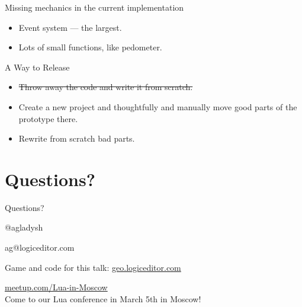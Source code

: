 \documentclass[aspectratio=169,handout,bigger]{beamer}
\newcommand{\soutt}[1]{%
    \renewcommand{\ULthickness}{1pt}%
       \sout{#1}%
    \renewcommand{\ULthickness}{.4pt}%
}
\begin{document}
\begin{frame}{Missing mechanics in the current implementation}
  \begin{itemize}
    \item Event system --- the largest.
    \item Lots of small functions, like pedometer.
  \end{itemize}
\end{frame}


\begin{frame}{A Way to Release}
  \begin{itemize}
    \item \soutt{Throw away the code and write it from scratch.}
    \item Create a new project and thoughtfully and manually
          move good parts of the prototype there.
    \item Rewrite from scratch bad parts.
  \end{itemize}
\end{frame}



\section{Questions?}

\begin{frame}[plain]{Questions?}

\begin{center}
\Huge{@agladysh}
\end{center}

\begin{center}
\Large{ag@logiceditor.com}
\end{center}

\begin{center}
Game and code for this talk:
\href{https://geo.logiceditor.com/}{geo.logiceditor.com}
\end{center}

\begin{center}
\href{http://meetup.com/Lua-in-Moscow}{meetup.com/Lua-in-Moscow}
\\
Come to our Lua conference in March 5th in Moscow!
\end{center}

\end{frame}

\end{document}
